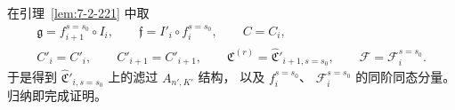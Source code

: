 在引理~\ref{lem:7-2-221} 中取
\[
\begin{gathered}
\mathfrak g=f_{i+1}^{s=s_0}\circ I_i,
\qquad
\mathfrak f=I'_i\circ f_i^{s=s_0},
\qquad C=C_i,\\
C'_i=C'_i,\qquad C'_{i+1}=C'_{i+1},
\qquad
\mathfrak C^{(r)}
=\widehat{\mathfrak C}'_{i+1,s=s_0},
\qquad
\mathcal F=\mathcal F_i^{s=s_0}.
\end{gathered}
\]
于是得到
$\widehat{\mathfrak C}'_{i,s=s_0}$
上的滤过 $A_{n',K'}$ 结构，
以及 $f_i^{s=s_0}$、
$\mathcal F_i^{s=s_0}$
的同阶同态分量。
归纳即完成证明。
